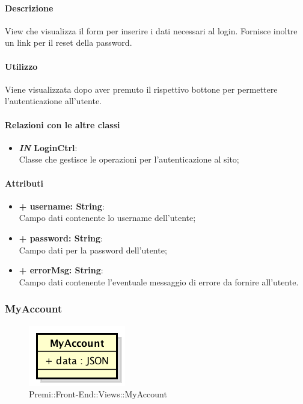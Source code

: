 	\paragraph{Descrizione}
	View che visualizza il form per inserire i dati necessari al login. Fornisce inoltre un link per il reset della password.
	
	\paragraph{Utilizzo}
	Viene visualizzata dopo aver premuto il rispettivo bottone per permettere l'autenticazione all'utente.
	
	\paragraph{Relazioni con le altre classi}
	\begin{itemize}
		\item \textbf{\textit{IN} LoginCtrl}:\\
		Classe che gestisce le operazioni per l'autenticazione al sito;
	\end{itemize}
	
	\paragraph{Attributi}
	\begin{itemize}
		\item \textbf{+ username: String}:\\
		Campo dati contenente lo username dell'utente;
		\item \textbf{+ password: String}:\\
		Campo dati per la password dell'utente;
		\item \textbf{+ errorMsg: String}:\\
		Campo dati contenente l'eventuale messaggio di errore da fornire all'utente.
	\end{itemize}
\newpage


\subsubsection{MyAccount}
	\begin{figure}[h]
		\centering
		\includegraphics[width=0.3\linewidth]{img/premi_front_end_views_myaccount}
		\caption[Premi::Front-End::Views::MyAccount]{Premi::Front-End::Views::MyAccount}
	\end{figure}
	
